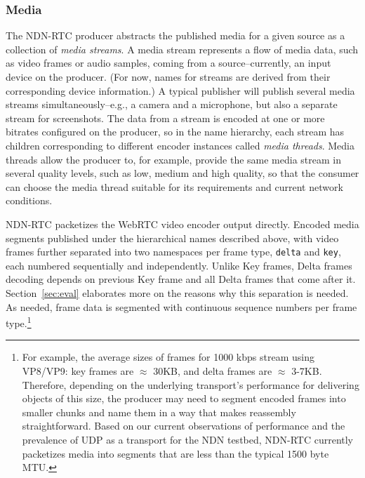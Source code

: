 \documentclass{icn/sig-alternate-2013} %
\newcommand{\ndnrtcName}{NDN-RTC} %
\begin{document}
\subsubsection{Media} 

The \ndnrtcName{} producer abstracts the published media for a given source as a collection of \textit{media streams}. A media stream represents a flow of media data, such as video frames or audio samples, coming from a source--currently, an input device on the producer. (For now, names for streams are derived from their corresponding device information.) A typical publisher will publish several media streams simultaneously--e.g., a camera and a microphone, but also a separate stream for screenshots.  The data from a stream is encoded at one or more bitrates configured on the producer, so in the name hierarchy, each stream has children corresponding to different encoder instances called \textit{media threads}. Media threads allow the producer to, for example, provide the same media stream in several quality levels, such as low, medium and high quality, so that the consumer can choose the media thread suitable for its requirements and current network conditions.

\ndnrtcName{} packetizes the WebRTC video encoder output directly. Encoded media segments published under the hierarchical names described above, with video frames further separated into two namespaces per frame type, \texttt{delta} and \texttt{key}, each numbered sequentially and independently. Unlike Key frames, Delta frames decoding depends on previous Key frame and all Delta frames that come after it. Section~\ref{sec:eval} elaborates more on the reasons why this separation is needed. 
As needed, frame data is segmented with continuous sequence numbers per frame type.\footnote{For example, the average sizes of frames for 1000 kbps stream using VP8/VP9: key frames are $\approx$ 30KB, and delta frames are $\approx$ 3-7KB. Therefore, depending on the underlying transport's performance for delivering objects of this size, the producer may need to segment encoded frames into smaller chunks and name them in a way that makes reassembly straightforward. Based on our current observations of performance and the prevalence of UDP as a transport for the NDN testbed, \ndnrtcName{} currently packetizes media into segments that are less than the typical 1500 byte MTU.}
\end{document}

